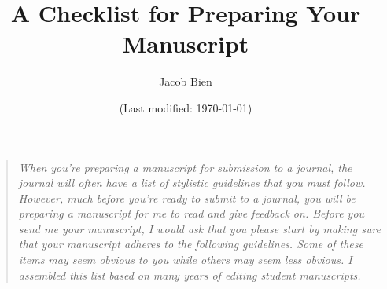 \documentclass[11pt]{article}
\title{A Checklist for Preparing Your Manuscript}
\author{Jacob Bien}
\date{(Last modified: \today)}
\begin{document}
\maketitle

\begin{quote}
{\em When you're preparing a manuscript for submission to a journal, the journal will often have a list of stylistic guidelines that you must follow.  However, much before you’re ready to submit to a journal, you will be preparing a manuscript for me to read and give feedback on.  Before you send me your manuscript, I would ask that you please start by making sure that your manuscript adheres to the following guidelines.  Some of these items may seem obvious to you while others may seem less obvious.  I assembled this list based on many years of editing student manuscripts.}
\end{quote}
\end{document}
